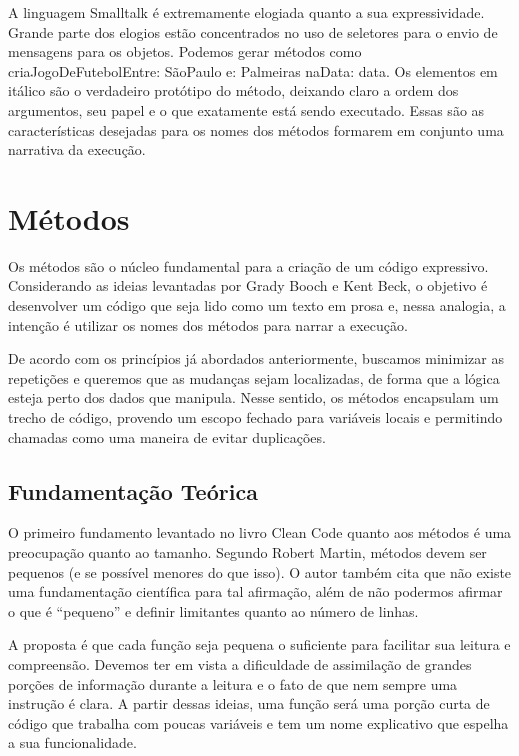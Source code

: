 A linguagem Smalltalk é extremamente elogiada quanto a sua expressividade. Grande parte dos elogios estão concentrados no uso de seletores para o envio de mensagens para os objetos. Podemos gerar métodos como criaJogoDeFutebolEntre: SãoPaulo e: Palmeiras naData: data. Os elementos em itálico são o verdadeiro protótipo do método, deixando claro a ordem dos argumentos, seu papel e o que exatamente está sendo executado. Essas são as características desejadas para os nomes dos métodos formarem em conjunto uma narrativa da execução.

\section{Métodos}
\label{sec:metodos}

Os métodos são o núcleo fundamental para a criação de um código expressivo. Considerando as ideias levantadas por Grady Booch e Kent Beck, o objetivo é desenvolver um código que seja lido como um texto em prosa e, nessa analogia, a intenção é utilizar os nomes dos métodos para narrar a execução.
	
De acordo com os princípios já abordados anteriormente, buscamos minimizar as repetições e queremos que as mudanças sejam localizadas, de forma que a lógica esteja perto dos dados que manipula. Nesse sentido, os métodos encapsulam um trecho de código, provendo um escopo fechado para variáveis locais e permitindo chamadas como uma maneira de evitar duplicações.

\subsection{Fundamentação Teórica}
O primeiro fundamento levantado no livro Clean Code quanto aos métodos é uma preocupação quanto ao tamanho. Segundo Robert Martin, métodos devem ser pequenos (e se possível menores do que isso). O autor também cita que não existe uma fundamentação científica para tal afirmação, além de não podermos afirmar o que é “pequeno” e definir limitantes quanto ao número de linhas.
	
A proposta é que cada função seja pequena o suficiente para facilitar sua leitura e compreensão. Devemos ter em vista a dificuldade de assimilação de grandes porções de informação durante a leitura e o fato de que nem sempre uma instrução é clara. A partir dessas ideias, uma função será uma porção curta de código que trabalha com poucas variáveis e tem um nome explicativo que espelha a sua funcionalidade.
	
